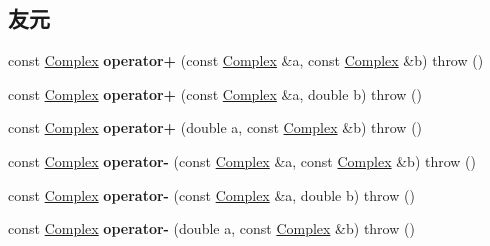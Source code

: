 \subsection*{友元}
\begin{DoxyCompactItemize}
\item 
\mbox{\label{classkerbal_1_1math_1_1_complex_a15f1ed9d213d1977e93cd2d1c3dd3177}} 
const \hyperlink{classkerbal_1_1math_1_1_complex}{Complex} {\bfseries operator+} (const \hyperlink{classkerbal_1_1math_1_1_complex}{Complex} \&a, const \hyperlink{classkerbal_1_1math_1_1_complex}{Complex} \&b)  throw ()
\item 
\mbox{\label{classkerbal_1_1math_1_1_complex_aa2c14f4bf3f680dc1e533d7898eb1203}} 
const \hyperlink{classkerbal_1_1math_1_1_complex}{Complex} {\bfseries operator+} (const \hyperlink{classkerbal_1_1math_1_1_complex}{Complex} \&a, double b)  throw ()
\item 
\mbox{\label{classkerbal_1_1math_1_1_complex_ae710480414fa9e6889c7137021e2261b}} 
const \hyperlink{classkerbal_1_1math_1_1_complex}{Complex} {\bfseries operator+} (double a, const \hyperlink{classkerbal_1_1math_1_1_complex}{Complex} \&b)  throw ()
\item 
\mbox{\label{classkerbal_1_1math_1_1_complex_a9a0ea8b6884b1d6d274e35fb440cb603}} 
const \hyperlink{classkerbal_1_1math_1_1_complex}{Complex} {\bfseries operator-\/} (const \hyperlink{classkerbal_1_1math_1_1_complex}{Complex} \&a, const \hyperlink{classkerbal_1_1math_1_1_complex}{Complex} \&b)  throw ()
\item 
\mbox{\label{classkerbal_1_1math_1_1_complex_a9db58f2272c8f7b1744a7a3fa694d01c}} 
const \hyperlink{classkerbal_1_1math_1_1_complex}{Complex} {\bfseries operator-\/} (const \hyperlink{classkerbal_1_1math_1_1_complex}{Complex} \&a, double b)  throw ()
\item 
\mbox{\label{classkerbal_1_1math_1_1_complex_a39e18ce1f9696248814706b5cb288f10}} 
const \hyperlink{classkerbal_1_1math_1_1_complex}{Complex} {\bfseries operator-\/} (double a, const \hyperlink{classkerbal_1_1math_1_1_complex}{Complex} \&b)  throw ()

\end{DoxyCompactItemize}
